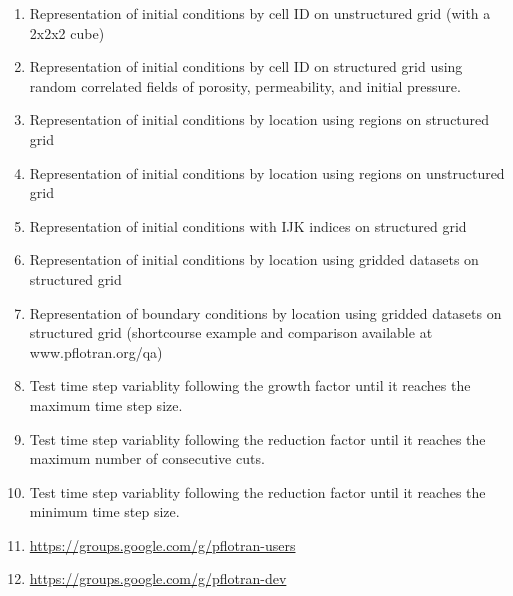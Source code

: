 \begin{enumerate}[label=Test \greek*.,ref=Test \greek*,nosep]
\item \label{testRepICCellIDUnstruc} Representation of initial conditions by cell ID on unstructured grid (with a 2x2x2 cube)
\item \label{testRepICCellIDStruc16} Representation of initial conditions by cell ID on structured grid using random correlated fields of porosity, permeability, and initial pressure.
\item \label{testRepICRegStruc} Representation of initial conditions by location using regions on structured grid
\item \label{testRepICRegUnstruc} Representation of initial conditions by location using regions on unstructured grid
\item \label{testRepICIJKStruc} Representation of initial conditions with IJK indices on structured grid
\item \label{testRepICGridStruc} Representation of initial conditions by location using gridded datasets on structured grid
\item \label{testRepBCGridStruc} Representation of boundary conditions by location using gridded datasets on structured grid (shortcourse example  and comparison available at www.pflotran.org/qa)
\item \label{testTimeStepGrowth} Test time step variablity following the growth factor until it reaches the maximum time step size.
\item \label{testTimeStepReductCut} Test time step variablity following the reduction factor until it reaches the maximum number of consecutive cuts.
\item \label{testTimeStepReduct} Test time step variablity following the reduction factor until it reaches the minimum time step size.
\item \label{testUserMailingList} \url{https://groups.google.com/g/pflotran-users}
\item \label{testDevMailingList} \url{https://groups.google.com/g/pflotran-dev}
\end{enumerate}



	
